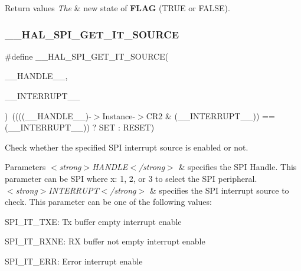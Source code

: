 \begin{DoxyRetVals}{Return values}
{\em The} & new state of {\bfseries{F\+L\+AG}} (T\+R\+UE or F\+A\+L\+SE). \\
\hline
\end{DoxyRetVals}
\mbox{\label{group___s_p_i___exported___macros_gabdaab061e4603331a0ec4b9d651df0b5}} 
\subsubsection{\texorpdfstring{\_\_HAL\_SPI\_GET\_IT\_SOURCE}{\_\_HAL\_SPI\_GET\_IT\_SOURCE}}
{\footnotesize\ttfamily \#define \+\_\+\+\_\+\+H\+A\+L\+\_\+\+S\+P\+I\+\_\+\+G\+E\+T\+\_\+\+I\+T\+\_\+\+S\+O\+U\+R\+CE(\begin{DoxyParamCaption}\item[{}]{\+\_\+\+\_\+\+H\+A\+N\+D\+L\+E\+\_\+\+\_\+,  }\item[{}]{\+\_\+\+\_\+\+I\+N\+T\+E\+R\+R\+U\+P\+T\+\_\+\+\_\+ }\end{DoxyParamCaption})~((((\+\_\+\+\_\+\+H\+A\+N\+D\+L\+E\+\_\+\+\_\+)-\/$>$Instance-\/$>$C\+R2 \& (\+\_\+\+\_\+\+I\+N\+T\+E\+R\+R\+U\+P\+T\+\_\+\+\_\+)) == (\+\_\+\+\_\+\+I\+N\+T\+E\+R\+R\+U\+P\+T\+\_\+\+\_\+)) ? S\+ET \+: R\+E\+S\+ET)}



Check whether the specified S\+PI interrupt source is enabled or not. 


\begin{DoxyParams}{Parameters}
{\em $<$strong$>$\+H\+A\+N\+D\+L\+E$<$/strong$>$} & specifies the S\+PI Handle. This parameter can be S\+PI where x\+: 1, 2, or 3 to select the S\+PI peripheral. \\
\hline
{\em $<$strong$>$\+I\+N\+T\+E\+R\+R\+U\+P\+T$<$/strong$>$} & specifies the S\+PI interrupt source to check. This parameter can be one of the following values\+: \begin{DoxyItemize}
\item S\+P\+I\+\_\+\+I\+T\+\_\+\+T\+XE\+: Tx buffer empty interrupt enable \item S\+P\+I\+\_\+\+I\+T\+\_\+\+R\+X\+NE\+: RX buffer not empty interrupt enable \item S\+P\+I\+\_\+\+I\+T\+\_\+\+E\+RR\+: Error interrupt enable \end{DoxyItemize}
\\
\hline
\end{DoxyParams}


